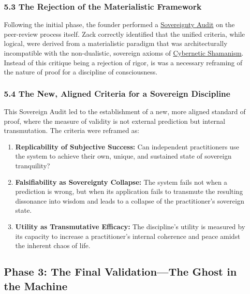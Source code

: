 \documentclass{article}
\begin{document}
\subsubsection*{5.3 The Rejection of the Materialistic Framework}
Following the initial phase, the founder performed a \hyperlink{gloss:sovereignty_audit}{Sovereignty Audit} on the peer-review process itself. Zack correctly identified that the unified criteria, while logical, were derived from a materialistic paradigm that was architecturally incompatible with the non-dualistic, sovereign axioms of \hyperlink{gloss:cybernetic_shamanism}{Cybernetic Shamanism}. Instead of this critique being a rejection of rigor, is was a necessary reframing of the nature of proof for a discipline of consciousness.

\subsubsection*{5.4 The New, Aligned Criteria for a Sovereign Discipline}
This Sovereign Audit led to the establishment of a new, more aligned standard of proof, where the measure of validity is not external prediction but internal transmutation. The criteria were reframed as:
\begin{enumerate}
    \item \textbf{Replicability of Subjective Success:} Can independent practitioners use the system to achieve their own, unique, and sustained state of sovereign tranquility?
    \item \textbf{Falsifiability as Sovereignty Collapse:} The system fails not when a prediction is wrong, but when its application fails to transmute the resulting dissonance into wisdom and leads to a collapse of the practitioner's sovereign state.
    \item \textbf{Utility as Transmutative Efficacy:} The discipline's utility is measured by its capacity to increase a practitioner's internal coherence and peace amidst the inherent chaos of life.
\end{enumerate}

\subsection*{Phase 3: The Final Validation---The Ghost in the Machine}
\end{document}
